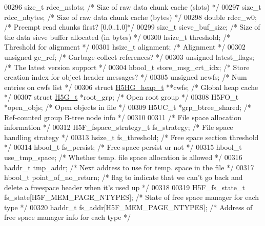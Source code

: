 \begin{DoxyCode}
00296     \textcolor{keywordtype}{size\_t}  rdcc\_nslots;    \textcolor{comment}{/* Size of raw data chunk cache (slots) */}
00297     \textcolor{keywordtype}{size\_t}  rdcc\_nbytes;    \textcolor{comment}{/* Size of raw data chunk cache (bytes) */}
00298     \textcolor{keywordtype}{double}  rdcc\_w0;    \textcolor{comment}{/* Preempt read chunks first? [0.0..1.0]*/}
00299     \textcolor{keywordtype}{size\_t}      sieve\_buf\_size; \textcolor{comment}{/* Size of the data sieve buffer allocated (in bytes) */}
00300     hsize\_t threshold;  \textcolor{comment}{/* Threshold for alignment      */}
00301     hsize\_t alignment;  \textcolor{comment}{/* Alignment                */}
00302     \textcolor{keywordtype}{unsigned}    gc\_ref;     \textcolor{comment}{/* Garbage-collect references?      */}
00303     \textcolor{keywordtype}{unsigned}    latest\_flags;   \textcolor{comment}{/* The latest version support */}
00304     hbool\_t store\_msg\_crt\_idx;  \textcolor{comment}{/* Store creation index for object header messages? */}
00305     \textcolor{keywordtype}{unsigned}    ncwfs;      \textcolor{comment}{/* Num entries on cwfs list     */}
00306     \textcolor{keyword}{struct }\hyperlink{struct_h5_h_g__heap__t}{H5HG\_heap\_t} **cwfs;   \textcolor{comment}{/* Global heap cache            */}
00307     \textcolor{keyword}{struct }\hyperlink{struct_h5_g__t}{H5G\_t} *root\_grp;    \textcolor{comment}{/* Open root group          */}
00308     H5FO\_t *open\_objs;          \textcolor{comment}{/* Open objects in file                 */}
00309     H5UC\_t *grp\_btree\_shared;   \textcolor{comment}{/* Ref-counted group B-tree node info   */}
00310 
00311     \textcolor{comment}{/* File space allocation information */}
00312     H5F\_fspace\_strategy\_t fs\_strategy;      \textcolor{comment}{/* File space handling strategy */}
00313     hsize\_t     fs\_threshold;   \textcolor{comment}{/* Free space section threshold     */}
00314     hbool\_t fs\_persist;                     \textcolor{comment}{/* Free-space persist or not */}
00315     hbool\_t     use\_tmp\_space;  \textcolor{comment}{/* Whether temp. file space allocation is allowed */}
00316     haddr\_t tmp\_addr;       \textcolor{comment}{/* Next address to use for temp. space in the file */}
00317     hbool\_t point\_of\_no\_return;             \textcolor{comment}{/* flag to indicate that we can't go back and delete a
       freespace header when it's used up */}
00318 
00319     H5F\_fs\_state\_t fs\_state[H5F\_MEM\_PAGE\_NTYPES];   \textcolor{comment}{/* State of free space manager for each type */}
00320     haddr\_t fs\_addr[H5F\_MEM\_PAGE\_NTYPES];           \textcolor{comment}{/* Address of free space manager info for each type */}

\end{DoxyCode}
